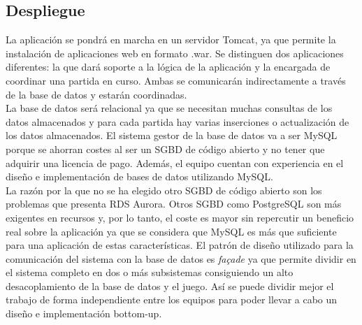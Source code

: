 \subsection{Despliegue}
La aplicación se pondrá en marcha en un servidor Tomcat, ya que permite la instalación de aplicaciones web en formato .war. Se distinguen dos aplicaciones diferentes: la que dará soporte a la lógica de la aplicación y la encargada de coordinar una partida en curso. Ambas se comunicarán indirectamente a través de la base de datos y estarán coordinadas. \\
La base de datos será relacional ya que se necesitan muchas consultas de los datos almacenados y para cada partida hay varias inserciones o actualización de los datos almacenados. El sistema gestor de la base de datos va a ser MySQL porque se ahorran costes al ser un SGBD de código abierto y no tener que adquirir una licencia de pago. Además, el equipo cuentan con experiencia en el diseño e implementación de bases de datos utilizando MySQL. \\
La razón por la que no se ha elegido otro SGBD de código abierto son los problemas que presenta RDS Aurora. Otros SGBD como PostgreSQL son más exigentes en recursos y, por lo tanto, el coste es mayor sin repercutir un beneficio real sobre la aplicación ya que se considera que MySQL es más que suficiente para una aplicación de estas características.
El patrón de diseño utilizado para la comunicación del sistema con la base de datos es \textit{façade} ya que permite dividir en el sistema completo en dos o más subsistemas consiguiendo un alto desacoplamiento de la base de datos y el juego. Así se puede dividir mejor el trabajo de forma independiente entre los equipos para poder llevar a cabo un diseño e implementación bottom-up.


